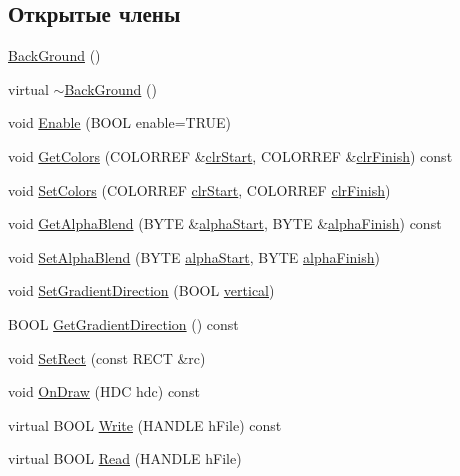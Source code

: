 \subsection*{Открытые члены}
\begin{DoxyCompactItemize}
\item 
\hyperlink{class_back_ground_a6a3fe7aa2ec8d57d372d336cd2d64337}{Back\-Ground} ()
\item 
virtual \hyperlink{class_back_ground_a6b14298ad37f17f054babadb2450f737}{$\sim$\-Back\-Ground} ()
\item 
void \hyperlink{class_back_ground_a3e779771d8962541787f3b9c1f265bd3}{Enable} (B\-O\-O\-L enable=T\-R\-U\-E)
\item 
void \hyperlink{class_back_ground_aa37dd21e916dcee3eee285103316b39e}{Get\-Colors} (C\-O\-L\-O\-R\-R\-E\-F \&\hyperlink{class_back_ground_ace5c696580cb70d04c43326e313d5086}{clr\-Start}, C\-O\-L\-O\-R\-R\-E\-F \&\hyperlink{class_back_ground_a76b44a73628e8503a1e56bc5253a5b1a}{clr\-Finish}) const 
\item 
void \hyperlink{class_back_ground_aa1000b4ae87a005caf92cbb10f948042}{Set\-Colors} (C\-O\-L\-O\-R\-R\-E\-F \hyperlink{class_back_ground_ace5c696580cb70d04c43326e313d5086}{clr\-Start}, C\-O\-L\-O\-R\-R\-E\-F \hyperlink{class_back_ground_a76b44a73628e8503a1e56bc5253a5b1a}{clr\-Finish})
\item 
void \hyperlink{class_back_ground_a65c9d4832f32f76967db4985b774f272}{Get\-Alpha\-Blend} (B\-Y\-T\-E \&\hyperlink{class_back_ground_ad3d27841bc53e26e464ed774aeaaad8d}{alpha\-Start}, B\-Y\-T\-E \&\hyperlink{class_back_ground_ae275790b73848c8919b63541ae948b0e}{alpha\-Finish}) const 
\item 
void \hyperlink{class_back_ground_a02d0cb2d464f0e90ca8cc430ffdc4553}{Set\-Alpha\-Blend} (B\-Y\-T\-E \hyperlink{class_back_ground_ad3d27841bc53e26e464ed774aeaaad8d}{alpha\-Start}, B\-Y\-T\-E \hyperlink{class_back_ground_ae275790b73848c8919b63541ae948b0e}{alpha\-Finish})
\item 
void \hyperlink{class_back_ground_a1e9833fea7630aa126314ede719a7776}{Set\-Gradient\-Direction} (B\-O\-O\-L \hyperlink{class_back_ground_a60e91e14cfea358477466c03bc918514}{vertical})
\item 
B\-O\-O\-L \hyperlink{class_back_ground_a1a10af7b8980d1268def9527f7e6cbce}{Get\-Gradient\-Direction} () const 
\item 
void \hyperlink{class_back_ground_a4e308cb320d9b028518c4fcdd3819ee6}{Set\-Rect} (const R\-E\-C\-T \&rc)
\item 
void \hyperlink{class_back_ground_afe1f339143f5c35bce336c130debf60e}{On\-Draw} (H\-D\-C hdc) const 
\item 
virtual B\-O\-O\-L \hyperlink{class_back_ground_ab21bb3686aac638ef0da5fb9a72c3925}{Write} (H\-A\-N\-D\-L\-E h\-File) const 
\item 
virtual B\-O\-O\-L \hyperlink{class_back_ground_aba05f03ff7484a1afad33c9400baf644}{Read} (H\-A\-N\-D\-L\-E h\-File)
\end{DoxyCompactItemize}
